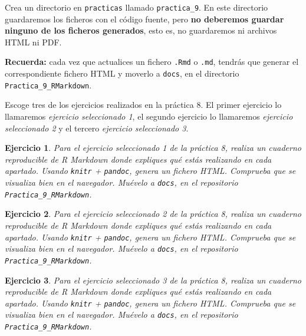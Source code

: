 \documentclass[11pt,a4paper]{article}
\theoremstyle{exercise}
\newtheorem{exercise}{Ejercicio}
\begin{document}
Crea un directorio en \texttt{practicas} llamado \texttt{practica\_9}. En este directorio guardaremos los ficheros con el código fuente, pero \textbf{no deberemos guardar ninguno de los ficheros generados}, esto es, no guardaremos ni archivos HTML ni PDF.

\noindent \textbf{Recuerda:} cada vez que actualices un fichero \texttt{.Rmd} o \texttt{.md}, tendrás que generar el correspondiente fichero HTML y moverlo a \texttt{docs}, en el directorio \texttt{Practica\_9\_RMarkdown}.

\medskip 

Escoge tres de los ejercicios realizados en la práctica 8. El primer ejercicio lo llamaremos \emph{ejercicio seleccionado 1}, el segundo ejercicio lo llamaremos \emph{ejercicio seleccionado 2} y el tercero \emph{ejercicio seleccionado 3}.


\begin{exercise} Para el \emph{ejercicio seleccionado 1} de la práctica 8, realiza un cuaderno reproducible de R Markdown donde expliques qué estás realizando en cada apartado. Usando \texttt{knitr} + \texttt{pandoc}, genera un fichero HTML. Comprueba que se visualiza bien en el navegador. Muévelo a \texttt{docs}, en el repositorio \texttt{Practica\_9\_RMarkdown}.
\end{exercise}


\begin{exercise} Para el \emph{ejercicio seleccionado 2} de la práctica 8, realiza un cuaderno reproducible de R Markdown donde expliques qué estás realizando en cada apartado. Usando \texttt{knitr} + \texttt{pandoc}, genera un fichero HTML. Comprueba que se visualiza bien en el navegador. Muévelo a \texttt{docs}, en el repositorio \texttt{Practica\_9\_RMarkdown}.
\end{exercise}


\begin{exercise} Para el \emph{ejercicio seleccionado 3} de la práctica 8, realiza un cuaderno reproducible de R Markdown donde expliques qué estás realizando en cada apartado. Usando \texttt{knitr} + \texttt{pandoc}, genera un fichero HTML. Comprueba que se visualiza bien en el navegador. Muévelo a \texttt{docs}, en el repositorio \texttt{Practica\_9\_RMarkdown}.
\end{exercise}
\end{document}

